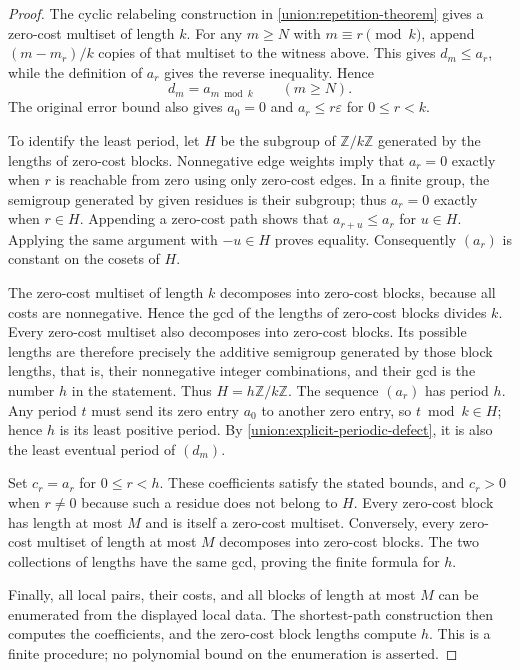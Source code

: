 \documentclass[10pt,a4paper]{amsart}
\numberwithin{equation}{section}
\theoremstyle{definition}
\theoremstyle{remark}
\begin{document}
\begin{proof}
The cyclic relabeling construction in
\cref{union:repetition-theorem} gives a zero-cost multiset of length
$k$. For any $m\ge N$ with $m\equiv r\pmod k$, append
$(m-m_r)/k$ copies of that multiset to the witness above. This gives
$d_m\le a_r$, while the definition of $a_r$ gives the reverse
inequality. Hence
\begin{equation}\label{union:explicit-periodic-defect}
 d_m=a_{m\bmod k}\qquad(m\ge N).
\end{equation}
The original error bound also gives $a_0=0$ and
$a_r\le r\varepsilon$ for $0\le r<k$.

To identify the least period, let $H$ be the subgroup of
$\mathbb Z/k\mathbb Z$ generated by the lengths of zero-cost
blocks. Nonnegative edge weights imply that $a_r=0$ exactly when
$r$ is reachable from zero using only zero-cost edges. In a finite
group, the semigroup generated by given residues is their subgroup;
thus $a_r=0$ exactly when $r\in H$.
Appending a zero-cost path shows that $a_{r+u}\le a_r$ for $u\in H$.
Applying the same argument with $-u\in H$ proves equality.
Consequently $(a_r)$ is constant on the cosets of $H$.

The zero-cost multiset of length $k$ decomposes into zero-cost blocks,
because all costs are nonnegative. Hence the gcd of the lengths of
zero-cost blocks divides $k$. Every zero-cost multiset also decomposes
into zero-cost blocks. Its possible lengths are therefore precisely
the additive semigroup generated by those block lengths, that is,
their nonnegative integer combinations, and their
gcd is the number $h$ in the statement. Thus $H=h\mathbb Z/k\mathbb Z$.
The sequence $(a_r)$ has period $h$. Any period $t$ must send its
zero entry $a_0$ to another zero entry, so $t\bmod k\in H$; hence $h$ is
its least positive period. By \eqref{union:explicit-periodic-defect},
it is also the least eventual period of $(d_m)$.

Set $c_r=a_r$ for $0\le r<h$. These coefficients satisfy the stated
bounds, and $c_r>0$ when $r\ne0$ because such a residue does not
belong to $H$. Every zero-cost block has length at most $M$ and is
itself a zero-cost multiset. Conversely, every zero-cost multiset
of length at most $M$ decomposes into zero-cost blocks. The two
collections of lengths have the same gcd, proving the finite
formula for $h$.

Finally, all local pairs, their costs, and all blocks of length at
most $M$ can be enumerated from the displayed local data. The
shortest-path construction then computes the coefficients, and
the zero-cost block lengths compute $h$. This is a finite
procedure; no polynomial bound on the enumeration is asserted.
\end{proof}
\end{document}
